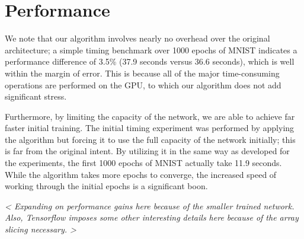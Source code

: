 \section{Performance}
We note that our algorithm involves nearly no overhead over the original architecture; a simple timing benchmark over 1000 epochs of MNIST indicates a performance difference of 3.5\% (37.9 seconds versus 36.6 seconds), which is well within the margin of error.
This is because all of the major time-consuming operations are performed on the GPU, to which our algorithm does not add significant stress.


Furthermore, by limiting the capacity of the network, we are able to achieve far faster initial training.
The initial timing experiment was performed by applying the algorithm but forcing it to use the full capacity of the network initially; this is far from the original intent.
By utilizing it in the same way as developed for the experiments, the first 1000 epochs of MNIST actually take 11.9 seconds.
While the algorithm takes more epochs to converge, the increased speed of working through the initial epochs is a significant boon.

\emph{ < Expanding on performance gains here because of the smaller trained network. Also, Tensorflow imposes some other interesting details here because of the array slicing necessary. > }
